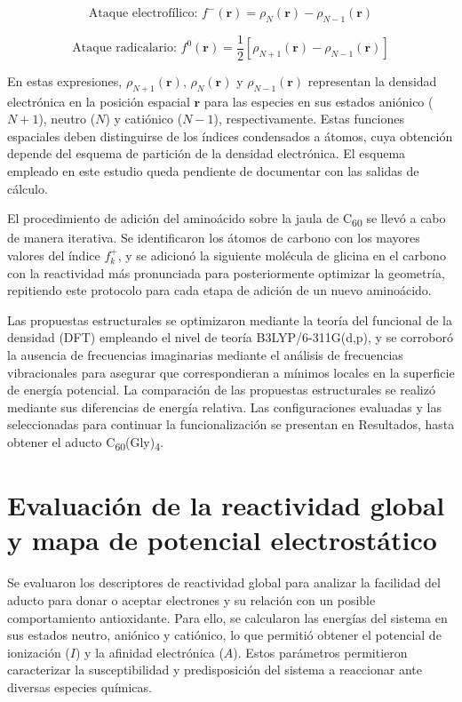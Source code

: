 \begin{equation}
    \text{Ataque electrofílico: } f^-(\mathbf{r}) = \rho_N(\mathbf{r}) - \rho_{N-1}(\mathbf{r})
\end{equation}

\begin{equation}
    \text{Ataque radicalario: } f^0(\mathbf{r}) = \frac{1}{2} \left[ \rho_{N+1}(\mathbf{r}) - \rho_{N-1}(\mathbf{r}) \right]
\end{equation}

En estas expresiones, $\rho_{N+1}(\mathbf{r})$, $\rho_N(\mathbf{r})$ y $\rho_{N-1}(\mathbf{r})$ representan la densidad electrónica en la posición espacial $\mathbf{r}$ para las especies en sus estados aniónico ($N+1$), neutro ($N$) y catiónico ($N-1$), respectivamente. Estas funciones espaciales deben distinguirse de los índices condensados a átomos, cuya obtención depende del esquema de partición de la densidad electrónica. El esquema empleado en este estudio queda pendiente de documentar con las salidas de cálculo.

El procedimiento de adición del aminoácido sobre la jaula de C\textsubscript{60} se llevó a cabo de manera iterativa. Se identificaron los átomos de carbono con los mayores valores del índice $f_k^+$, y se adicionó la siguiente molécula de glicina en el carbono con la reactividad más pronunciada para posteriormente optimizar la geometría, repitiendo este protocolo para cada etapa de adición de un nuevo aminoácido.

Las propuestas estructurales se optimizaron mediante la teoría del funcional de la densidad (DFT) empleando el nivel de teoría B3LYP/6-311G(d,p), y se corroboró la ausencia de frecuencias imaginarias mediante el análisis de frecuencias vibracionales para asegurar que correspondieran a mínimos locales en la superficie de energía potencial. La comparación de las propuestas estructurales se realizó mediante sus diferencias de energía relativa. Las configuraciones evaluadas y las seleccionadas para continuar la funcionalización se presentan en Resultados, hasta obtener el aducto C\textsubscript{60}(Gly)\textsubscript{4}.
\section{Evaluación de la reactividad global y mapa de potencial electrostático}
Se evaluaron los descriptores de reactividad global para analizar la facilidad del aducto para donar o aceptar electrones y su relación con un posible comportamiento antioxidante. Para ello, se calcularon las energías del sistema en sus estados neutro, aniónico y catiónico, lo que permitió obtener el potencial de ionización ($I$) y la afinidad electrónica ($A$). Estos parámetros permitieron caracterizar la susceptibilidad y predisposición del sistema a reaccionar ante diversas especies químicas.

